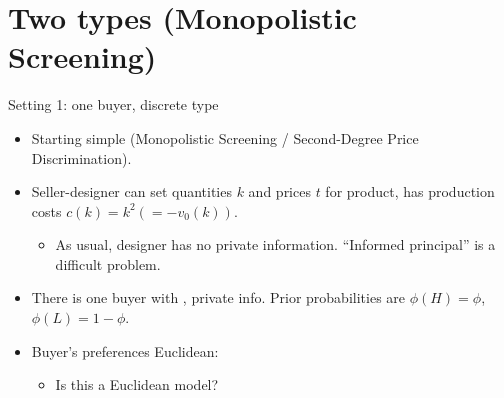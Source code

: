 \documentclass[english,10pt
,aspectratio=169
]{beamer}
\begin{document}
\section{Two types (Monopolistic Screening)}

\begin{frame}{Setting 1: one buyer, discrete type}
\begin{itemize}
	\item Starting simple (\alert{Monopolistic Screening} / Second-Degree Price Discrimination).
	\item Seller-designer can set quantities $k$ and prices $t$ for product, has production costs $c(k) = k^2 (=-v_0(k))$.
	\begin{itemize}
		\item As usual, designer has no private information. ``Informed principal'' is a difficult problem.
	\end{itemize}
	\item There is one buyer with , private info. Prior probabilities are $\phi(H) = \phi$, $\phi(L)=1-\phi$.
	\item Buyer's preferences Euclidean: 
	\begin{itemize}
		\item Is this a Euclidean model? %
	\end{itemize}
\end{itemize}
\end{frame}
\end{document}
